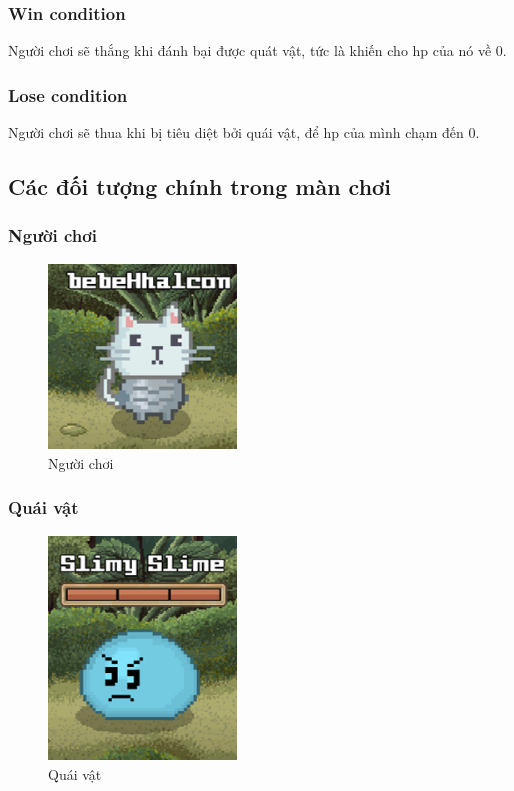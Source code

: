 \subsubsection{Win condition}
Người chơi sẽ thắng khi đánh bại được quát vật, tức là khiến cho hp của nó về 0.
\subsubsection{Lose condition}
Người chơi sẽ thua khi bị tiêu diệt bởi quái vật, để hp của mình chạm đến 0.
\subsection{Các đối tượng chính trong màn chơi}
\subsubsection{Người chơi}
\begin{figure}[H]
	\centering
	\includegraphics[width=5cm]{Images/Player.png}
	\vspace{0.5cm}
	\caption{Người chơi}
\end{figure}
\subsubsection{Quái vật}
\begin{figure}[H]
	\centering
	\includegraphics[width=5cm]{Images/Monster.png}
	\vspace{0.5cm}
	\caption{Quái vật}
\end{figure}
